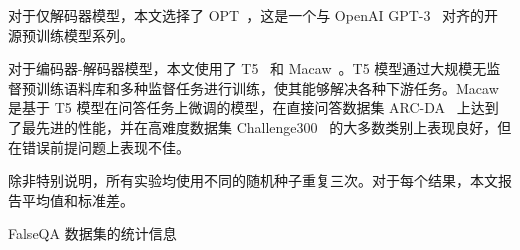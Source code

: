 对于仅解码器模型，本文选择了 OPT~\cite{zhang2022opt}，这是一个与 OpenAI GPT-3~\cite{brown2020language} 对齐的开源预训练模型系列。

对于编码器-解码器模型，本文使用了 T5~\cite{raffel2020exploring} 和 Macaw~\cite{tafjord2021general}。T5 模型通过大规模无监督预训练语料库和多种监督任务进行训练，使其能够解决各种下游任务。Macaw 是基于 T5 模型在问答任务上微调的模型，在直接问答数据集 ARC-DA~\cite{bhakthavatsalam2021think} 上达到了最先进的性能，并在高难度数据集 Challenge300~\cite{tafjord2021general} 的大多数类别上表现良好，但在错误前提问题上表现不佳。

除非特别说明，所有实验均使用不同的随机种子重复三次。对于每个结果，本文报告平均值和标准差。

\begin{table}[!htbp]
    \centering
    \begin{minipage}{0.46\linewidth}
        \centering
        \caption{FalseQA 数据集的统计信息}
        \label{tab:statisticsofFPQ}
    \end{minipage}
    \hfill
    \begin{minipage}{0.49\linewidth}
        \centering
        \caption{错误前提问题的二分类结果}
\end{minipage}
\end{table}
